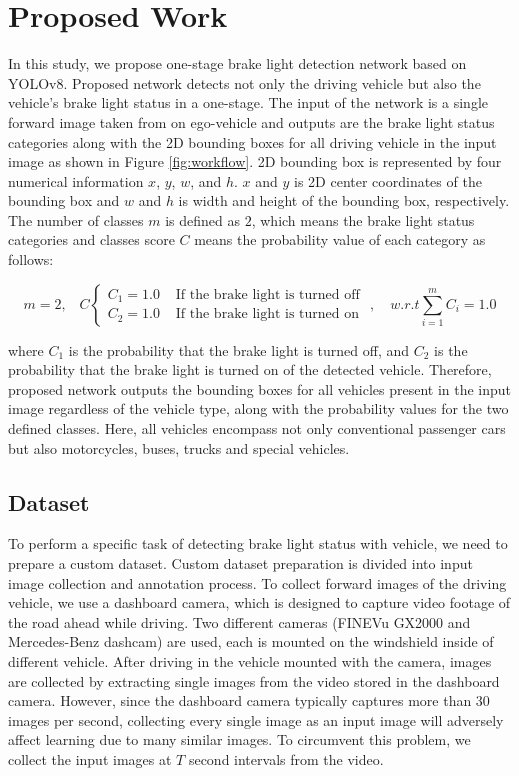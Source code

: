 \section{Proposed Work}
\label{sec:proposed}

In this study, we propose one-stage brake light detection network based on YOLOv8. Proposed network detects not only the driving vehicle but also the vehicle's brake light status in a one-stage. 
The input of the network is a single forward image taken from on ego-vehicle and outputs are the brake light status categories along with the 2D bounding boxes for all driving vehicle in the input image as shown in Figure \ref{fig:workflow}.
2D bounding box is represented by four numerical information $x$, $y$, $w$, and $h$. $x$ and $y$ is 2D center coordinates of the bounding box and $w$ and $h$ is width and height of the bounding box, respectively. 
The number of classes $m$ is defined as $2$, which means the brake light status categories and classes score $C$ means the probability value of each category as follows:

\begin{equation}
    m=2, \;\;\; C   \begin{cases}
        C_{1}=1.0 & \text{ If the brake light is turned off } \\
        C_{2}=1.0 & \text{ If the brake light is turned on }
        \end{cases}
        , \quad w.r.t \sum_{i=1}^{m}{C_{i}}=1.0
\end{equation}

where $C_{1}$ is the probability that the brake light is turned off, and $C_{2}$ is the probability that the brake light is turned on of the detected vehicle.
Therefore, proposed network outputs the bounding boxes for all vehicles present in the input image regardless of the vehicle type, along with the probability values for the two defined classes.
Here, all vehicles encompass not only conventional passenger cars but also motorcycles, buses, trucks and special vehicles.

\subsection{Dataset}
\label{sec:method_dataset}
To perform a specific task of detecting brake light status with vehicle, we need to prepare a custom dataset.
Custom dataset preparation is divided into input image collection and annotation process.
To collect forward images of the driving vehicle, we use a dashboard camera, which is designed to capture video footage of the road ahead while driving. Two different cameras (FINEVu GX2000 and Mercedes-Benz dashcam) are used, each is mounted on the windshield inside of different vehicle.
After driving in the vehicle mounted with the camera, images are collected by extracting single images from the video stored in the dashboard camera. 
However, since the dashboard camera typically captures more than 30 images per second, collecting every single image as an input image will adversely affect learning due to many similar images.
To circumvent this problem, we collect the input images at $T$ second intervals from the video.

